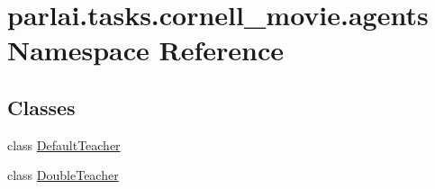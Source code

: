 \hypertarget{namespaceparlai_1_1tasks_1_1cornell__movie_1_1agents}{}\section{parlai.\+tasks.\+cornell\+\_\+movie.\+agents Namespace Reference}
\label{namespaceparlai_1_1tasks_1_1cornell__movie_1_1agents}
\subsection*{Classes}
\begin{DoxyCompactItemize}
\item 
class \hyperlink{classparlai_1_1tasks_1_1cornell__movie_1_1agents_1_1DefaultTeacher}{Default\+Teacher}
\item 
class \hyperlink{classparlai_1_1tasks_1_1cornell__movie_1_1agents_1_1DoubleTeacher}{Double\+Teacher}
\end{DoxyCompactItemize}
